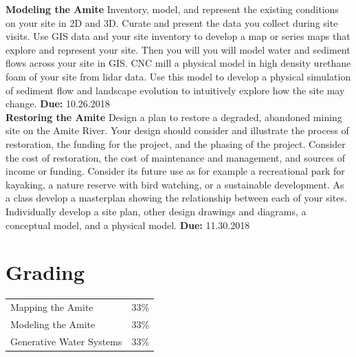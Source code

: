 \documentclass[11pt,article,oneside]{memoir}
\makeatletter
\newcommand{\globalcolor}[1]{%
  \color{#1}\global\let\default@color\current@color
}
\makeatother
\begin{document}
\noindent \textbf{Modeling the Amite}
Inventory, model, and represent the existing conditions
on your site in 2D and 3D.
Curate and present the data you collect during site visits.
Use GIS data and your site inventory
to develop a map or series maps that explore and represent your site.
Then you will you will model water and sediment flows across your site in GIS.
CNC mill a physical model in high density urethane foam
of your site from lidar data.
Use this model to develop a physical simulation of sediment flow
and landscape evolution to intuitively explore how the site may change.
\textbf{Due:} 10.26.2018 \\

\noindent \textbf{Restoring the Amite}
Design a plan to restore a degraded, abandoned mining site
on the Amite River.
Your design should consider and illustrate the process of restoration,
the funding for the project, and the phasing of the project.
Consider the cost of restoration, the cost of maintenance and management,
and sources of income or funding.
Consider its future use as for example
a recreational park for kayaking,
a nature reserve with bird watching,
or a sustainable development.
As a class develop a masterplan showing the relationship
between each of your sites.
Individually develop a site plan, other design drawings and diagrams,
a conceptual model, and a physical model.
\textbf{Due:} 11.30.2018 \\

\section{Grading}
%
\begin{table}[H]
\begin{tabular}{l r}
%
Mapping the Amite & 33\% \\
Modeling the Amite & 33\% \\
Generative Water Systems & 33\% \\
%
\end{tabular}
\end{table}

\clearpage


\globalcolor{white}

\clearpage
\globalcolor{black}
\end{document}
